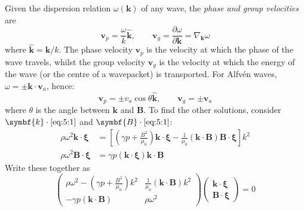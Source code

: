 \documentclass{jknotes}
\newcommand{\B}{\symbf{B}}
\newcommand{\disp}{\symbf{\xi}}
\renewcommand{\v}{\symbf{v}}
\begin{document}
Given the dispersion relation $\omega(\symbf{k})$ of any wave, the \emph{phase
and group velocities} are
\begin{equation}
	\v_p = \frac{\omega}{k}\hat{\symbf{k}}, \hspace{2em} \v_g = \frac{\partial
	\omega}{\partial \symbf{k}} = \nabla_{\symbf{k}} \omega
\end{equation}
where $\hat{\symbf{k}} = \symbf{k}/k$. The phase velocity $\v_p$ is the
velocity at which the phase of the wave travels, whilst the group velocity
$\v_g$ is the velocity at which the energy of the wave (or the centre of a
wavepacket) is transported. For Alfv\'{e}n waves, $\omega = \pm
\symbf{k}\cdot\v_a$, hence:
\begin{equation}
	\v_p = \pm v_a \cos \theta \hat{\symbf{k}}, \hspace{2em} \v_g = \pm \v_a
\end{equation}
where $\theta$ is the angle between $\symbf{k}$ and $\B$. To find the other
solutions, consider $\symbf{k}\cdot\eqref{eq:5:1}$ and $\B \cdot
\eqref{eq:5:1}$:
\begin{align}
	\rho \omega^2 \symbf{k}\cdot\disp &= \left[ \left( \gamma p +
	\frac{B^2}{\mu_0}\right) \symbf{k}\cdot\disp -
	\frac{1}{\mu_0}(\symbf{k}\cdot\B)\B\cdot\disp\right] k^2 \\
	\rho \omega^2 \B \cdot \disp &= \gamma p
	(\symbf{k}\cdot\disp)\symbf{k}\cdot\B
\end{align}
Write these together as
\begin{equation}
	\begin{pmatrix} 
		\rho \omega^2 - \left( \gamma p + \frac{B^2}{\mu_0}\right)k^2 &
		\frac{1}{\mu_0}(\symbf{k}\cdot\B)k^2 \\
	-\gamma p (\symbf{k}\cdot\B) & \rho \omega^2 \end{pmatrix} 
	\begin{pmatrix} \symbf{k}\cdot\disp \\ \B \cdot \disp \end{pmatrix} = 0
\end{equation}
\end{document}

